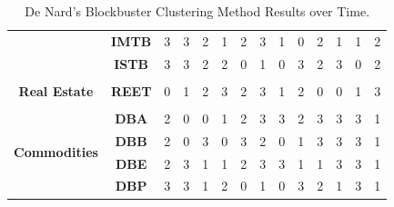 \begin{table}[h!]
{\begin{tabular}{ccllllllllllll}
         & \textbf{IMTB} & 3 & 3 & 2 & 1 & 2 & 3 & 1 & 0 & 2 & 1 & 1 & 2 \\
         & \textbf{ISTB} & 3 & 3 & 2 & 2 & 0 & 1 & 0 & 3 & 2 & 3 & 0 & 2 \\
         \hline \\
        \textbf{Real Estate} & \textbf{REET} & 0 & 1 & 2 & 3 & 2 & 3 & 1 & 2 & 0 & 0 & 1 & 3 \\
        \hline \\
        \multirow{4}{*}{\textbf{Commodities}} & \textbf{DBA} & 2 & 0 & 0 & 1 & 2 & 3 & 3 & 2 & 3 & 3 & 3 & 1 \\
         & \textbf{DBB} & 2 & 0 & 3 & 0 & 3 & 2 & 0 & 1 & 3 & 3 & 3 & 1 \\
         & \textbf{DBE} & 2 & 3 & 1 & 1 & 2 & 3 & 3 & 1 & 1 & 3 & 3 & 1 \\
         & \textbf{DBP} & 3 & 3 & 1 & 2 & 0 & 1 & 0 & 3 & 2 & 1 & 3 & 1
    \end{tabular}}
    \caption{De Nard's Blockbuster Clustering Method Results over Time.}
\end{table}